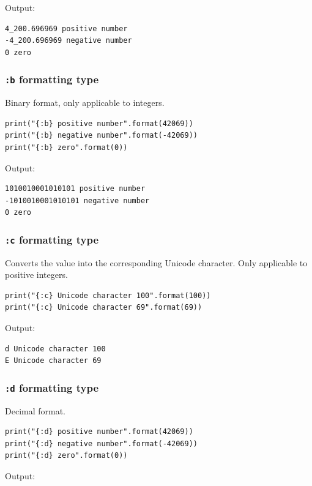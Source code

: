 \documentclass[11pt]{article}
\begin{document}
 \noindent Output:

\begin{verbatim}
4_200.696969 positive number
-4_200.696969 negative number
0 zero
\end{verbatim}

\subsubsection{\texttt{:b} formatting type}
\label{sec:org0118d15}
Binary format, only applicable to integers.

\begin{verbatim}
print("{:b} positive number".format(42069))
print("{:b} negative number".format(-42069))
print("{:b} zero".format(0))
\end{verbatim}

 \noindent Output:

\begin{verbatim}
1010010001010101 positive number
-1010010001010101 negative number
0 zero
\end{verbatim}

\subsubsection{\texttt{:c} formatting type}
\label{sec:org7fd8769}
Converts the value into the corresponding Unicode character. Only applicable to positive integers.

\begin{verbatim}
print("{:c} Unicode character 100".format(100))
print("{:c} Unicode character 69".format(69))
\end{verbatim}

 \noindent Output:

\begin{verbatim}
d Unicode character 100
E Unicode character 69
\end{verbatim}

\subsubsection{\texttt{:d} formatting type}
\label{sec:org487cc2c}
Decimal format.

\begin{verbatim}
print("{:d} positive number".format(42069))
print("{:d} negative number".format(-42069))
print("{:d} zero".format(0))
\end{verbatim}

 \noindent Output:
\end{document}
